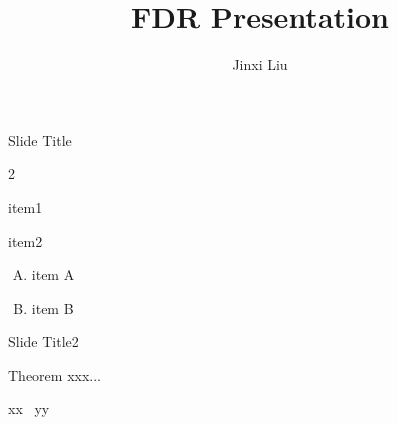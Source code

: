 \documentclass{beamer}
\title{FDR Presentation}
\author{Jinxi Liu}
\begin{document}
	
\begin{frame}
	
\titlepage
	
\end{frame}

\begin{frame}[t]{Slide Title}\vspace{10pt}
	\begin{enumerate}

	\end{enumerate}
	
	\begin{enumerate}[(A)]
		\item item A
		\item item B
	\end{enumerate}
	
	
\end{frame}

\begin{frame}[t]{Slide Title2}\vspace{10pt}
\begin{block}{Theorem}
	xxx...
\end{block}

\vspace{10pt}
xx  
\, yy


\end{frame}
\end{document}
